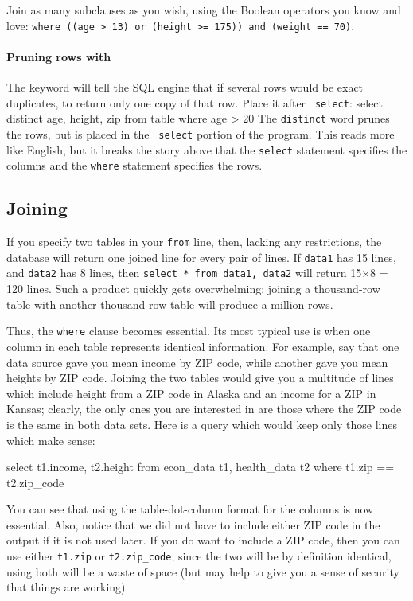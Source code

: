 Join as many subclauses as you wish, using the Boolean operators you
know and love: {\tt where ((age > 13) or (height >= 175)) and (weight == 70)}.


\paragraph{Pruning rows with } The 
keyword will tell the SQL engine that if several rows would be exact
duplicates, to return only one copy of that row. Place it after {\tt
select}: 
select distinct age, height, zip
from table
where age > 20
The  {\tt distinct} word prunes the rows, but is placed in the {\tt
select} portion of the program.  This reads more like English, but it
breaks the story above that the {\tt select} statement specifies the
columns and the {\tt where} statement specifies the rows.

\subsection{Joining}
If you specify two tables in your {\tt from} line, then, lacking any
restrictions, the database will return one joined line for every pair of lines.
If {\tt data1} has 15 lines, and {\tt data2} has 8 lines, then {\tt select *
from data1, data2} will return 15$\times$8 = 120 lines.  Such a product
quickly gets overwhelming: joining a thousand-row table with another
thousand-row table will produce a million rows.

Thus, the {\tt where} clause becomes essential. Its most typical use is
when one column in each table represents identical information. For
example, say that one data source gave you mean income by ZIP code,
while another gave you mean heights by ZIP code. Joining the two tables
would give you a multitude of lines which include height from a ZIP code
in Alaska and an income for a ZIP in Kansas; clearly, the only ones you
are interested in are those where the ZIP code is the same in both data
sets. Here is a query which would keep only those lines which make
sense:

select t1.income, t2.height
   from econ_data t1, health_data t2
   where t1.zip == t2.zip_code

You can see that using the table-dot-column format for the columns is now
essential. Also, notice that we did not have to include either ZIP code
in the output if it is not used later. If you do want to include a ZIP
code, then you can use either {\tt t1.zip} or {\tt t2.zip\_code}; since
the two will be by definition identical, using both will be a waste of
space (but may help to give you a sense of security that things are working).

